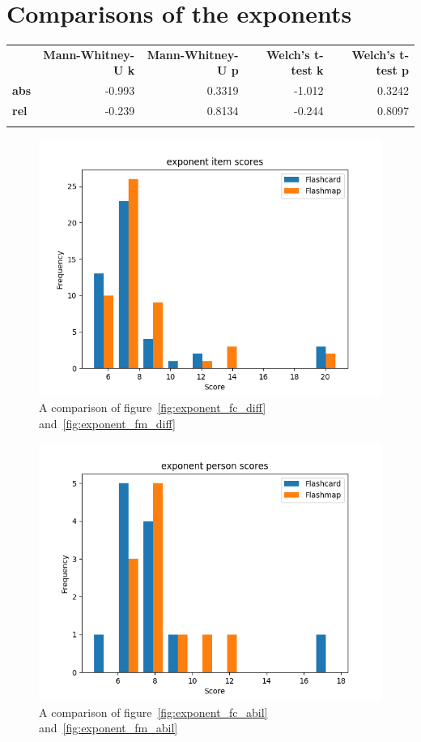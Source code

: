 \FloatBarrier
\section{Comparisons of the exponents}

\begin{longtable}[c]{@{}lrrrr@{}}
\toprule\addlinespace
& \textbf{Mann-Whitney-U k} & \textbf{Mann-Whitney-U p} &
\textbf{Welch's t-test k} & \textbf{Welch's t-test p}
\\\addlinespace
\midrule\endhead
\textbf{abs} & -0.993 & 0.3319 & -1.012 & 0.3242
\\\addlinespace
\textbf{rel} & -0.239 & 0.8134 & -0.244 & 0.8097
\\\addlinespace
\bottomrule
    \label{tab:exponent_comp}
\end{longtable}

\begin{figure}
    \includegraphics[width=.7\textwidth]{img/exponent_diff.png}
    \caption{A comparison of figure~\protect\ref{fig:exponent_fc_diff} and~\protect\ref{fig:exponent_fm_diff}}
    \label{fig:exponent_diff}
\end{figure}
\begin{figure}
    \includegraphics[width=.7\textwidth]{img/exponent_abil.png}
    \caption{A comparison of figure~\protect\ref{fig:exponent_fc_abil} and~\protect\ref{fig:exponent_fm_abil}}
    \label{fig:exponent_abil}
\end{figure}

